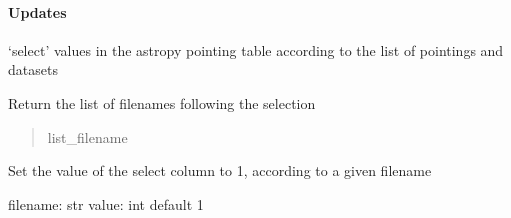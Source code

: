 \documentclass[letterpaper,10pt,english]{sphinxmanual}
\begin{document}
\begin{fulllineitems}
\begin{fulllineitems}
\paragraph{Updates}
\label{\detokenize{api/pymusepipe:id135}}
\sphinxAtStartPar
‘select’ values in the astropy pointing table according to the list of pointings and
datasets

\end{fulllineitems}


\begin{fulllineitems}
\label{\detokenize{api/pymusepipe:pymusepipe.util_image.PointingTable.selected_filenames}}
\pysigstartsignatures
{}
\pysigstopsignatures
\sphinxAtStartPar
Return the list of filenames following the selection
\begin{quote}\begin{description}
\sphinxAtStartPar
list\_filename

\end{description}\end{quote}

\end{fulllineitems}


\begin{fulllineitems}
\label{\detokenize{api/pymusepipe:pymusepipe.util_image.PointingTable.set_select_value}}
\pysigstartsignatures
{}
\pysigstopsignatures
\sphinxAtStartPar
Set the value of the select column to 1, according to a given filename

\sphinxAtStartPar
filename: str
value: int default 1

\end{fulllineitems}



\end{fulllineitems}
\end{document}
